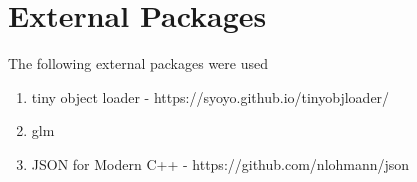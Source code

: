 \documentclass{report}
\begin{document}
\section{External Packages}

The following external packages were used 
\begin{enumerate}
    \item tiny object loader - https://syoyo.github.io/tinyobjloader/
    \item glm
    \item JSON for Modern C++ - https://github.com/nlohmann/json
\end{enumerate}

\enddocument
\end{document}
